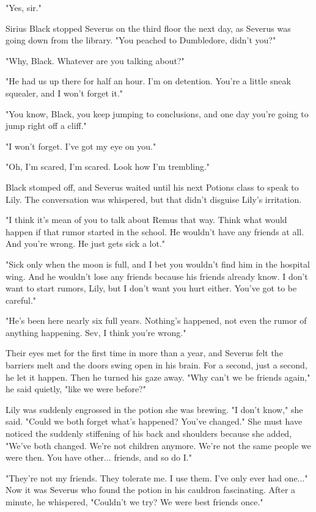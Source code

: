 "Yes, sir."

Sirius Black stopped Severus on the third floor the next day, as Severus was going down from the library. "You peached to Dumbledore, didn't you?"

"Why, Black. Whatever are you talking about?"

"He had us up there for half an hour. I'm on detention. You're a little sneak squealer, and I won't forget it."

"You know, Black, you keep jumping to conclusions, and one day you're going to jump right off a cliff."

"I won't forget. I've got my eye on you."

"Oh, I'm scared, I'm scared. Look how I'm trembling."

Black stomped off, and Severus waited until his next Potions class to speak to Lily. The conversation was whispered, but that didn't disguise Lily's irritation.

"I think it's mean of you to talk about Remus that way. Think what would happen if that rumor started in the school. He wouldn't have any friends at all. And you're wrong. He just gets sick a lot."

"Sick only when the moon is full, and I bet you wouldn't find him in the hospital wing. And he wouldn't lose any friends because his friends already know. I don't want to start rumors, Lily, but I don't want you hurt either. You've got to be careful."

"He's been here nearly six full years. Nothing's happened, not even the rumor of anything happening. Sev, I think you're wrong."

Their eyes met for the first time in more than a year, and Severus felt the barriers melt and the doors swing open in his brain. For a second, just a second, he let it happen. Then he turned his gaze away. "Why can't we be friends again," he said quietly, "like we were before?"

Lily was suddenly engrossed in the potion she was brewing. "I don't know," she said. "Could we both forget what's happened? You've changed." She must have noticed the suddenly stiffening of his back and shoulders because she added, "We've both changed. We're not children anymore. We're not the same people we were then. You have other... friends, and so do I."

"They're not my friends. They tolerate me. I use them. I've only ever had one..." Now it was Severus who found the potion in his cauldron fascinating. After a minute, he whispered, "Couldn't we try? We were best friends once."

